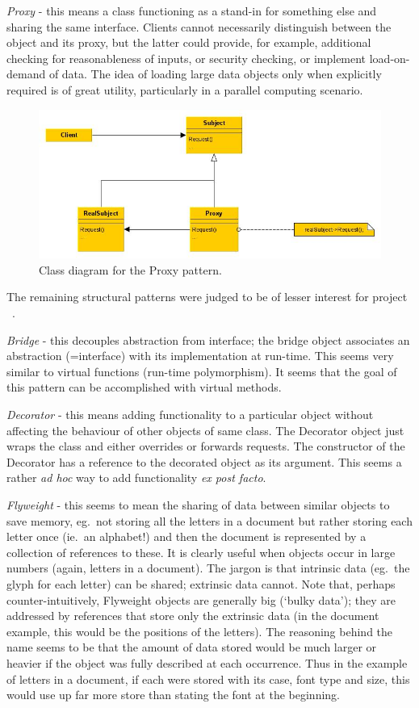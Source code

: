 {\it Proxy} - this means a class functioning as a stand-in for something else and sharing the same interface.
Clients cannot necessarily distinguish between the object and its proxy, but the latter could provide, for example, additional checking for reasonableness of inputs, or security checking, or implement load-on-demand of data.
The idea of loading large data objects only when explicitly required is of great utility, particularly in a parallel computing scenario.

\begin{figure}
\begin{centering}
\includegraphics[width=12cm]{../png/proxy.jpg}
\end{centering}
\caption{Class diagram for the Proxy pattern.\label{fig:proxy}}
\end{figure}

The remaining structural patterns were judged to be of lesser interest for project \nep \ .

{\it Bridge} - this decouples abstraction from interface; the bridge object associates an abstraction (=interface) with its implementation at run-time.
This seems very similar to virtual functions (run-time polymorphism).
It seems that the goal of this pattern can be accomplished with virtual methods.

{\it Decorator} - this means adding functionality to a particular object without affecting the behaviour of other objects of same class.
The Decorator object just wraps the class and either overrides or forwards requests.
The constructor of the Decorator has a reference to the decorated object as its argument.
This seems a rather {\it ad hoc} way to add functionality {\it ex post facto}. 

{\it Flyweight} - this seems to mean the sharing of data between similar objects to save memory, eg.\ not storing all the letters in a document but rather storing each letter once (ie.\ an alphabet!) and then the document is represented by a collection of references to these.
It is clearly useful when objects occur in large numbers (again, letters in a document).
The jargon is that intrinsic data (eg.\ the glyph for each letter) can be shared; extrinsic data cannot.
Note that, perhaps counter-intuitively, Flyweight objects are generally big (`bulky data'); they are addressed by references that store only the extrinsic data (in the document example, this would be the positions of the letters).
The reasoning behind the name seems to be that the amount of data stored would be much larger
or heavier if the object was fully described at each occurrence. Thus in the example of letters
in a document, if each were stored with its case, font type and size, this would use up far more
store than stating the font at the beginning.

